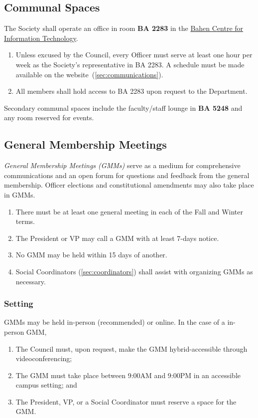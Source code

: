 \subsection{Communal Spaces}\label{sec:communal-spaces}
The Society shall operate an office in room \textbf{BA 2283} in the
\href{https://map.utoronto.ca/?id=1809#!m/494470}{Bahen Centre for Information
      Technology}.

\begin{enumerate}
      \item Unless excused by the Council, every Officer must serve at least one hour per
            week as the Society's representative in BA 2283. A schedule must be made
            available on the website~(\ref{sec:communications}).
      \item All members shall hold access to BA 2283 upon request to the Department.
\end{enumerate}
Secondary communal spaces include the faculty/staff lounge in \textbf{BA 5248}
and any room reserved for events.

\subsection{General Membership Meetings}
\textit{General Membership Meetings (GMMs)} serve as a medium for comprehensive communications and an open forum for questions and feedback from the general membership. Officer elections and constitutional amendments may also take place in GMMs.

\begin{enumerate}
      \item There must be at least one general meeting in each of the Fall and Winter
            terms.
      \item The President or VP may call a GMM with at least 7-days notice.
      \item No GMM may be held within 15 days of another.
      \item Social Coordinators (\ref{sec:coordinators}) shall assist with organizing GMMs
            as necessary.
\end{enumerate}

\subsubsection{Setting}
GMMs may be held in-person (recommended) or online. In the case of a in-person
GMM,

\begin{enumerate}
      \item The Council must, upon request, make the GMM hybrid-accessible through
            videoconferencing;
      \item The GMM must take place between 9:00AM and 9:00PM in an accessible campus
            setting; and
      \item The President, VP, or a Social Coordinator must reserve a space for the GMM.\@
\end{enumerate}

